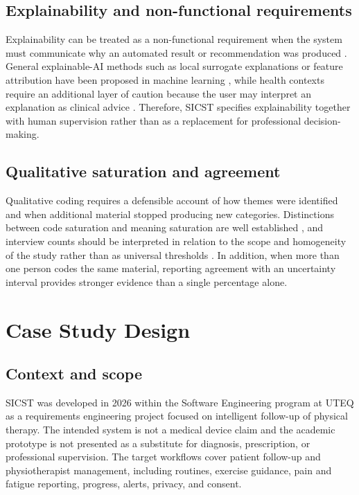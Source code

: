 \documentclass[10pt,a4paper]{article}
\begin{document}
\subsection{Explainability and non-functional requirements}
Explainability can be treated as a non-functional requirement when the system must communicate why an automated result or recommendation was produced \citep{chazette2020explainability}. General explainable-AI methods such as local surrogate explanations or feature attribution have been proposed in machine learning \citep{ribeiro2016lime,lundberg2017shap}, while health contexts require an additional layer of caution because the user may interpret an explanation as clinical advice \citep{holzinger2017xai}. Therefore, SICST specifies explainability together with human supervision rather than as a replacement for professional decision-making.

\subsection{Qualitative saturation and agreement}
Qualitative coding requires a defensible account of how themes were identified and when additional material stopped producing new categories. Distinctions between code saturation and meaning saturation are well established \citep{hennink2017codesaturation}, and interview counts should be interpreted in relation to the scope and homogeneity of the study rather than as universal thresholds \citep{guest2006interviews}. In addition, when more than one person codes the same material, reporting agreement with an uncertainty interval provides stronger evidence than a single percentage alone.

\section{Case Study Design}
\subsection{Context and scope}
SICST was developed in 2026 within the Software Engineering program at UTEQ as a requirements engineering project focused on intelligent follow-up of physical therapy. The intended system is not a medical device claim and the academic prototype is not presented as a substitute for diagnosis, prescription, or professional supervision. The target workflows cover patient follow-up and physiotherapist management, including routines, exercise guidance, pain and fatigue reporting, progress, alerts, privacy, and consent.
\end{document}
